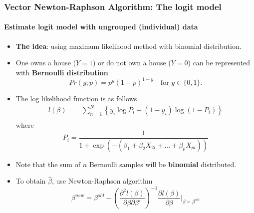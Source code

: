 \documentclass[10pt]{beamer}
\begin{document}
\begin{frame}
  \frametitle{Vector Newton-Raphson Algorithm: The logit model}
  \framesubtitle{Estimate logit model with ungrouped (individual) data}
  \begin{itemize}
  \item \textbf{The idea}: using maximum likelihood method with binomial
    distribution.
  \item One owns a house ($Y=1$) or do not own a house ($Y=0$) can be
    represented with \textbf{Bernoulli distribution}
    \begin{equation*}
      Pr(y;p) = p^y (1-p)^{1-y}\!\quad \text{for }y\in\{0,1\}.
    \end{equation*}
  \item The log likelihood function is as follows
    \begin{equation*}
      \begin{split}
        l(\beta)=& \sum \limits_{n=1}^N\left\{ y_i \log P_i + (1- y_i)
          \log (1-P_i)  \right\}\\
      \end{split}
    \end{equation*}
    where
    \begin{equation*}
      P_i=\frac{1}{1+\exp(-(\beta_1+\beta_2X_{2i}+...+\beta_pX_{pi}))}
    \end{equation*}

  \item Note that the sum of $n$ Bernoulli samples will be \textbf{binomial}
    distributed.

  \item To obtain $\hat \beta$, use Newton-Raphson algorithm
    \begin{equation*}
      \beta^{new} = \beta^{old} - \left(\frac{\partial^2l(\beta)}{\partial
          \beta\partial \beta'}  \right)^{-1} \frac{\partial
        l(\beta)}{\partial\beta} | _{\beta= \beta^{old}}
    \end{equation*}

  \end{itemize}
\end{frame}
\end{document}
